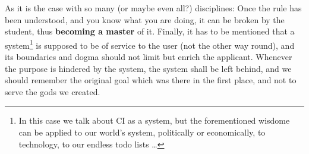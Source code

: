 As it is the case with so many (or maybe even all?) disciplines: Once the rule has been understood, and you know what you are doing, it can be broken by the student, thus \textbf{becoming a master} of it.
Finally, it has to be mentioned that a system\footnote{In this case we talk about CI as a system, but the forementioned wisdome can be applied to our world's system, politically or economically, to technology, to our endless todo lists \ldots} is supposed to be of service to the user (not the other way round), and its boundaries and dogma should not limit but enrich the applicant.
Whenever the purpose is hindered by the system, the system shall be left behind, and we should remember the original goal which was there in the first place, and not to serve the gods we created.
